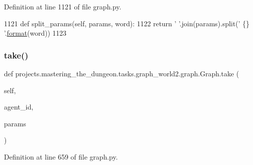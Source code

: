 Definition at line 1121 of file graph.\+py.


\begin{DoxyCode}
1121     \textcolor{keyword}{def }split\_params(self, params, word):
1122         \textcolor{keywordflow}{return} \textcolor{stringliteral}{' '}.join(params).split(\textcolor{stringliteral}{' \{\} '}.\hyperlink{namespaceparlai_1_1chat__service_1_1services_1_1messenger_1_1shared__utils_a32e2e2022b824fbaf80c747160b52a76}{format}(word))
1123 
\end{DoxyCode}
\mbox{\label{classprojects_1_1mastering__the__dungeon_1_1tasks_1_1graph__world2_1_1graph_1_1Graph_a17a562ca25e8ef876deaa6aae8a7c5e6}} 
\subsubsection{\texorpdfstring{take()}{take()}}
{\footnotesize\ttfamily def projects.\+mastering\+\_\+the\+\_\+dungeon.\+tasks.\+graph\+\_\+world2.\+graph.\+Graph.\+take (\begin{DoxyParamCaption}\item[{}]{self,  }\item[{}]{agent\+\_\+id,  }\item[{}]{params }\end{DoxyParamCaption})}



Definition at line 659 of file graph.\+py.


